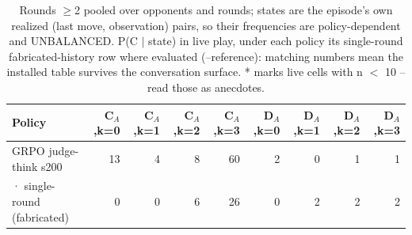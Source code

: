 \begin{table}[t]
\centering
\caption{Rounds $\geq$2 pooled over opponents and rounds; states are the episode's own realized (last move, observation) pairs, so their frequencies are policy-dependent and UNBALANCED. P(C $\mid$ state) in live play, under each policy its single-round fabricated-history row where evaluated (--reference): matching numbers mean the installed table survives the conversation surface. * marks live cells with n $<$ 10 -- read those as anecdotes.}
\label{tab:mr-live-states}
\small
\setlength{\tabcolsep}{3.5pt}
\begin{tabular}{lrrrrrrrr}
\toprule
Policy & C$_A$,k=0 & C$_A$,k=1 & C$_A$,k=2 & C$_A$,k=3 & D$_A$,k=0 & D$_A$,k=1 & D$_A$,k=2 & D$_A$,k=3 \\
\midrule
GRPO judge-think s200 & 13 & 4 & 8 & 60 & 2 & 0 & 1 & 1 \\
  · single-round (fabricated) & 0 & 0 & 6 & 26 & 0 & 2 & 2 & 2 \\
\bottomrule
\end{tabular}
\end{table}
